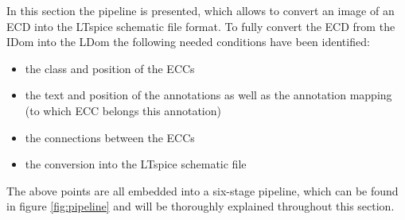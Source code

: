 \label{sec:pipeline}

In this section the pipeline is presented, which allows to convert an image of an \ac{ECD} into the LTspice schematic file format.
To fully convert the \ac{ECD} from the \ac{IDom} into the \ac{LDom} the following needed conditions have been identified:

\begin{itemize}
    \item the class and position of the \acp{ECC}
    \item the text and position of the annotations as well as the annotation mapping (to which \ac{ECC} belongs this annotation)
    \item the connections between the \acp{ECC}
    \item the conversion into the LTspice schematic file
\end{itemize}

The above points are all embedded into a six-stage pipeline, which can be found in figure \ref{fig:pipeline} and will be thoroughly explained throughout this section.

